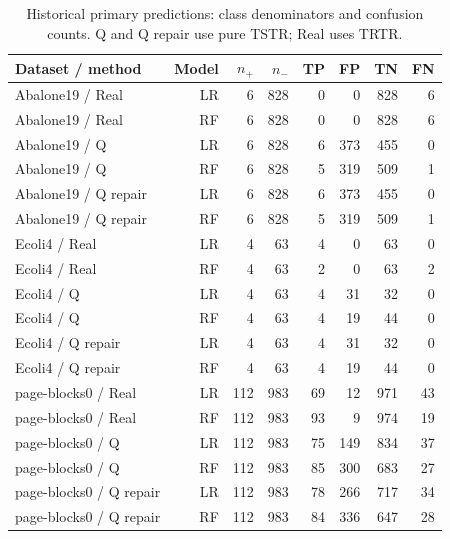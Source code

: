 \begin{table}[!t]
\centering
\caption{Historical primary predictions: class denominators and confusion counts. Q and Q repair use pure TSTR; Real uses TRTR.}\label{tab:confusions}
\footnotesize\setlength{\tabcolsep}{6pt}
\begin{tabular}{lrrrrrrr}
\toprule
Dataset / method & Model & $n_+$ & $n_-$ & TP & FP & TN & FN \\
\midrule
Abalone19 / Real & LR & 6 & 828 & 0 & 0 & 828 & 6 \\
Abalone19 / Real & RF & 6 & 828 & 0 & 0 & 828 & 6 \\
Abalone19 / Q & LR & 6 & 828 & 6 & 373 & 455 & 0 \\
Abalone19 / Q & RF & 6 & 828 & 5 & 319 & 509 & 1 \\
Abalone19 / Q repair & LR & 6 & 828 & 6 & 373 & 455 & 0 \\
Abalone19 / Q repair & RF & 6 & 828 & 5 & 319 & 509 & 1 \\
Ecoli4 / Real & LR & 4 & 63 & 4 & 0 & 63 & 0 \\
Ecoli4 / Real & RF & 4 & 63 & 2 & 0 & 63 & 2 \\
Ecoli4 / Q & LR & 4 & 63 & 4 & 31 & 32 & 0 \\
Ecoli4 / Q & RF & 4 & 63 & 4 & 19 & 44 & 0 \\
Ecoli4 / Q repair & LR & 4 & 63 & 4 & 31 & 32 & 0 \\
Ecoli4 / Q repair & RF & 4 & 63 & 4 & 19 & 44 & 0 \\
page-blocks0 / Real & LR & 112 & 983 & 69 & 12 & 971 & 43 \\
page-blocks0 / Real & RF & 112 & 983 & 93 & 9 & 974 & 19 \\
page-blocks0 / Q & LR & 112 & 983 & 75 & 149 & 834 & 37 \\
page-blocks0 / Q & RF & 112 & 983 & 85 & 300 & 683 & 27 \\
page-blocks0 / Q repair & LR & 112 & 983 & 78 & 266 & 717 & 34 \\
page-blocks0 / Q repair & RF & 112 & 983 & 84 & 336 & 647 & 28 \\
\bottomrule
\end{tabular}
\end{table}
